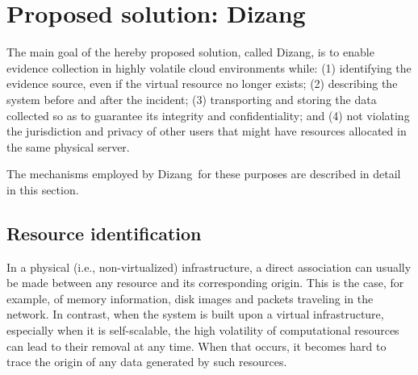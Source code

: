 \documentclass[10pt,journal,compsoc]{IEEEtran}
\newcommand{\fancyname}{Dizang}
\begin{document}
\section{Proposed solution: \fancyname}
\label{sec:proposal}

The main goal of the hereby proposed solution, called \fancyname, is to enable evidence collection in highly volatile cloud environments while:
(1) identifying the evidence source, even if the virtual resource no longer exists; 
(2) describing the system before and after the incident;
(3) transporting and storing the data collected so as to guarantee its integrity and confidentiality; and
(4) not violating the jurisdiction and privacy of other users that might have resources allocated in the same physical server.


The mechanisms employed by \fancyname\ for these purposes are described in detail in this section.


\subsection{Resource identification}
\label{sec:proposal-desc-id}

In a physical (i.e., non-virtualized) infrastructure, a direct association can usually be made between any resource and its corresponding origin.
%
This is the case, for example, of memory information, disk images and packets traveling in the network.
%
In contrast, when the system is built upon a virtual infrastructure, especially when it is self-scalable, the high volatility of computational resources can lead to their removal at any time.
%
When that occurs, it becomes hard to trace the origin of any data generated by such resources.
\end{document}
